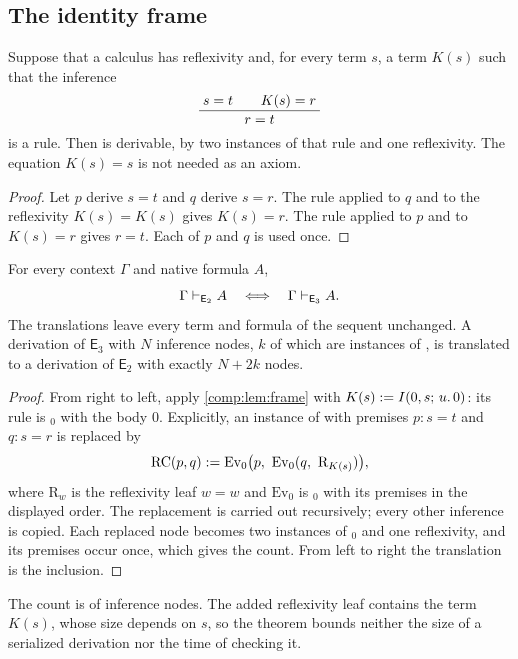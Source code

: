 \subsection{The identity frame}

\begin{lemma}
\label{comp:lem:frame}
Suppose that a calculus has reflexivity and, for every term $s$, a term
$K(s)$ such that the inference
\[
 \dfrac{\;s=t\qquad K(s)=r\;}{\;r=t\;}
\]
is a rule. Then  is derivable, by two instances of that rule
and one reflexivity. The equation $K(s)=s$ is not needed as an axiom.
\end{lemma}

\begin{proof}
Let $p$ derive $s=t$ and $q$ derive $s=r$. The rule applied to $q$ and to
the reflexivity $K(s)=K(s)$ gives $K(s)=r$. The rule applied to $p$ and to
$K(s)=r$ gives $r=t$. Each of $p$ and $q$ is used once.
\end{proof}

\begin{theorem}
\label{comp:thm:root}
For every context $\Gamma$ and native formula $A$,
\[
 \Gamma\vdash_{\mathsf{E}_2}A\quad\Longleftrightarrow\quad
 \Gamma\vdash_{\mathsf{E}_3}A .
\]
The translations leave every term and formula of the sequent unchanged. A
derivation of $\mathsf{E}_3$ with $N$ inference nodes, $k$ of which are
instances of , is translated to a derivation of
$\mathsf{E}_2$ with exactly $N+2k$ nodes.
\end{theorem}

\begin{proof}
From right to left, apply \cref{comp:lem:frame} with
$K(s)\mathrel{:=}I(0,s;\,u.\,0)$: its rule is $_0$ with the body
$0$. Explicitly, an instance of  with premises $p\colon s=t$
and $q\colon s=r$ is replaced by
\[
 \mathrm{RC}(p,q)\defeq
 \mathrm{Ev}_0\bigl(p,\ \mathrm{Ev}_0(q,\ \mathrm{R}_{K(s)})\bigr),
\]
where $\mathrm{R}_{w}$ is the reflexivity leaf $w=w$ and $\mathrm{Ev}_0$ is
$_0$ with its premises in the displayed order. The
replacement is carried out recursively; every other inference is copied.
Each replaced node becomes two instances of $_0$ and one
reflexivity, and its premises occur once, which gives the count. From left
to right the translation is the inclusion.
\end{proof}

The count is of inference nodes. The added reflexivity leaf contains the
term $K(s)$, whose size depends on $s$, so the theorem bounds neither the
size of a serialized derivation nor the time of checking it.

